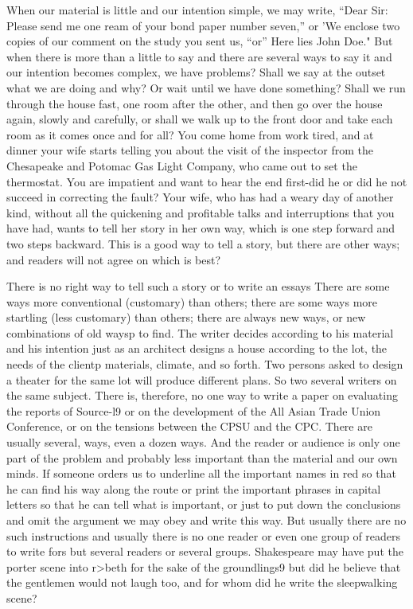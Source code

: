 \documentclass[
    oneside,
    11pt,
    draft
]{memoir}
\begin{document}
When our material is little and our intention simple, we may write, \enquote{Dear Sir: Please send me one ream of your bond paper number seven,} or 'We enclose two copies of our comment on the study you sent us, \enquote{or} Here lies John Doe." But when there is more than a little to say and there are several ways to say it and our intention becomes complex, we have problems? Shall we say at the outset what we are doing and why? Or wait until we have done something? Shall we run through the house fast, one room after the other, and then go over the house again, slowly and carefully, or shall we walk up to the front door and take each room as it comes once and for all? You come home from work tired, and at dinner your wife starts telling you about the visit of the inspector from the Chesapeake and Potomac Gas Light Company, who came out to set the thermostat. You are impatient and want to hear the end first-did he or did he not succeed in correcting the fault? Your wife, who has had a weary day of another kind, without all the quickening and profitable talks and interruptions that you have had, wants to tell her story in her own way, which is one step forward and two steps backward. This is a good way to tell a story, but there are other ways; and readers will not agree on which is best?

There is no right way to tell such a story or to write an essays There are some ways more conventional (customary) than others; there are some ways more startling (less customary) than others; there are always new ways, or new combinations of old waysp to find. The writer decides according to his material and his intention just as an architect designs a house according to the lot, the needs of the clientp materials, climate, and so forth. Two persons asked to design a theater for the same lot will produce different plans. So two several writers on the same subject. There is, therefore, no one way to write a paper on evaluating the reports of Source-l9 or on the development of the All Asian Trade Union Conference, or on the tensions between the CPSU and the CPC. There are usually several, ways, even a dozen ways. And the reader or audience is only one part of the problem and probably less important than the material and our own minds. If someone orders us to underline all the important names in red so that he can find his way along the route or print the important phrases in capital letters so that he can tell what is important, or just to put down the conclusions and omit the argument we may obey and write this way. But usually there are no such instructions and usually there is no one reader or even one group of readers to write fors but several readers or several groups. Shakespeare may have put the porter scene into r>beth for the sake of the groundlings9 but did he believe that the gentlemen would not laugh too, and for whom did he write the sleepwalking scene?
\end{document}
